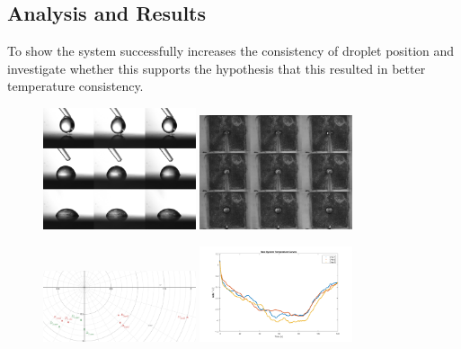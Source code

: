 \newpage
\subsection{Analysis and Results}

To show the system successfully increases the consistency of droplet position and investigate whether this supports the hypothesis that this resulted in better temperature consistency.

\begin{figure}[h]
    \centering
    \includegraphics[width=0.4\textwidth]{img/side_drops.png}
    \includegraphics[width=0.4\textwidth]{img/top_drops.png}
\end{figure}

\begin{figure}[h]
    \centering
    \includegraphics[width=0.4\textwidth]{img/pos_comp.png}
    \includegraphics[width=0.4\textwidth]{img/new_temp.png}
\end{figure}

